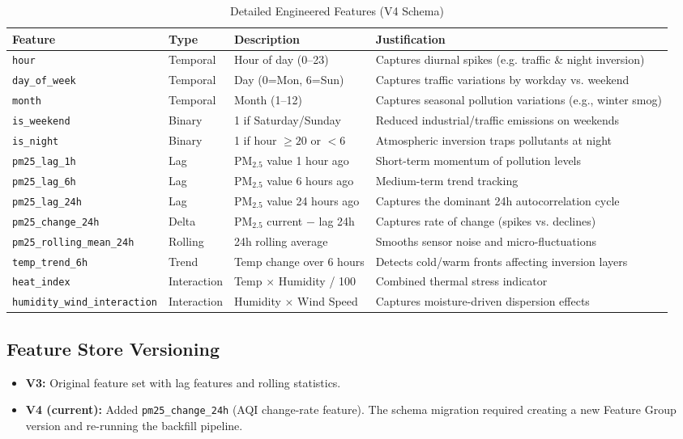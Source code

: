 \documentclass[11pt,a4paper]{article}
\begin{document}
\begin{table}[h!]
\centering
\small
\begin{tabularx}{\textwidth}{l l l X}
\toprule
\textbf{Feature} & \textbf{Type} & \textbf{Description} & \textbf{Justification} \\
\midrule
\texttt{hour} & Temporal & Hour of day (0--23) & Captures diurnal spikes (e.g. traffic \& night inversion) \\
\texttt{day\_of\_week} & Temporal & Day (0=Mon, 6=Sun) & Captures traffic variations by workday vs. weekend \\
\texttt{month} & Temporal & Month (1--12) & Captures seasonal pollution variations (e.g., winter smog) \\
\texttt{is\_weekend} & Binary & 1 if Saturday/Sunday & Reduced industrial/traffic emissions on weekends \\
\texttt{is\_night} & Binary & 1 if hour $\ge 20$ or $< 6$ & Atmospheric inversion traps pollutants at night \\
\texttt{pm25\_lag\_1h} & Lag & $\text{PM}_{2.5}$ value 1 hour ago & Short-term momentum of pollution levels \\
\texttt{pm25\_lag\_6h} & Lag & $\text{PM}_{2.5}$ value 6 hours ago & Medium-term trend tracking \\
\texttt{pm25\_lag\_24h} & Lag & $\text{PM}_{2.5}$ value 24 hours ago & Captures the dominant 24h autocorrelation cycle \\
\texttt{pm25\_change\_24h} & Delta & $\text{PM}_{2.5}$ current $-$ lag 24h & Captures rate of change (spikes vs. declines) \\
\texttt{pm25\_rolling\_mean\_24h} & Rolling & 24h rolling average & Smooths sensor noise and micro-fluctuations \\
\texttt{temp\_trend\_6h} & Trend & Temp change over 6 hours & Detects cold/warm fronts affecting inversion layers \\
\texttt{heat\_index} & Interaction & Temp $\times$ Humidity / 100 & Combined thermal stress indicator \\
\texttt{humidity\_wind\_interaction} & Interaction & Humidity $\times$ Wind Speed & Captures moisture-driven dispersion effects \\
\bottomrule
\end{tabularx}
\caption{Detailed Engineered Features (V4 Schema)}
\label{tab:features}
\end{table}

\subsection{Feature Store Versioning}
\begin{itemize}
    \item \textbf{V3:} Original feature set with lag features and rolling statistics.
    \item \textbf{V4 (current):} Added \texttt{pm25\_change\_24h} (AQI change-rate feature). The schema migration required creating a new Feature Group version and re-running the backfill pipeline.
\end{itemize}
\end{document}
